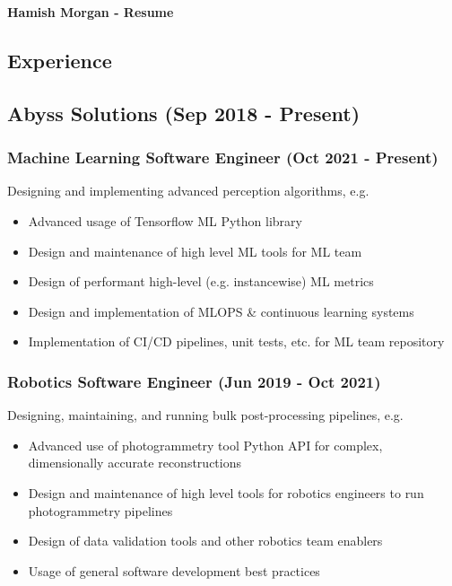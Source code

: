 \documentclass[12pt]{article}
\begin{document}
\begin{center}
  \Large
  \vspace{0.8cm}
  \textbf{Hamish Morgan - Resume}\\
\end{center}


\begin{FlushLeft}
  
  \section*{Experience}
  
  \subsection*{Abyss Solutions (Sep 2018 - Present)}
  
  \subsubsection*{Machine Learning Software Engineer (Oct 2021 - Present)}
  Designing and implementing advanced perception algorithms, e.g.
  \begin{itemize}
  \item Advanced usage of Tensorflow ML Python library
  \item Design and maintenance of high level ML tools for ML team
  \item Design of performant high-level (e.g. instancewise) ML metrics
  \item Design and implementation of MLOPS \& continuous learning systems
  \item Implementation of CI/CD pipelines, unit tests, etc. for ML team repository
  \end{itemize}
  
  \subsubsection*{Robotics Software Engineer (Jun 2019 - Oct 2021)}
  Designing, maintaining, and running bulk post-processing pipelines, e.g.
  \begin{itemize}
  \item Advanced use of photogrammetry tool Python API for complex, dimensionally accurate reconstructions
  \item Design and maintenance of high level tools for robotics engineers to run photogrammetry pipelines
  \item Design of data validation tools and other robotics team enablers
  \item Usage of general software development best practices
  \end{itemize}
  

\end{FlushLeft}
\end{document}
